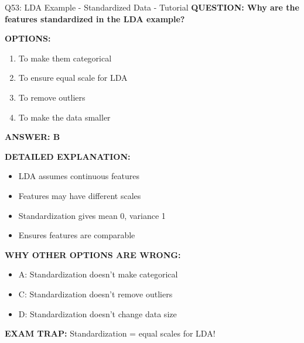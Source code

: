 \documentclass[8pt]{beamer}
\begin{document}
\begin{frame}{Q53: LDA Example - Standardized Data - Tutorial}
	\fontsize{6.5}{7.5}\selectfont
	\textbf{QUESTION: Why are the features standardized in the LDA example?}
	
	\vspace{0.1cm}
	\textbf{OPTIONS:}
	\begin{enumerate}
		\item To make them categorical
		\item To ensure equal scale for LDA
		\item To remove outliers
		\item To make the data smaller
	\end{enumerate}
	
	\vspace{0.1cm}
	\textcolor{myblue}{\textbf{ANSWER: B}}
	
	\vspace{0.1cm}
	\textbf{DETAILED EXPLANATION:}
	\begin{itemize}
		\item LDA assumes continuous features
		\item Features may have different scales
		\item Standardization gives mean 0, variance 1
		\item Ensures features are comparable
	\end{itemize}
	
	\vspace{0.1cm}
	\textcolor{myred}{\textbf{WHY OTHER OPTIONS ARE WRONG:}}
	\begin{itemize}
		\item \textcolor{myred}{A:} Standardization doesn't make categorical
		\item \textcolor{myred}{C:} Standardization doesn't remove outliers
		\item \textcolor{myred}{D:} Standardization doesn't change data size
	\end{itemize}
	
	\textcolor{myred}{\textbf{EXAM TRAP:}} Standardization = \textcolor{myblue}{equal scales} for LDA!
\end{frame}
\end{document}
